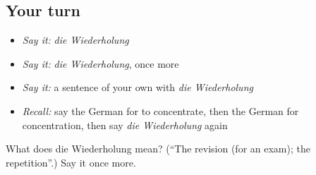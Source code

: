 \subsection*{Your turn}
\begin{itemize}
\raggedright
  \item \emph{Say it:} \emph{die Wiederholung}
  \item \emph{Say it:} \emph{die Wiederholung}, once more
  \item \emph{Say it:} a sentence of your own with \emph{die Wiederholung}
  \item \emph{Recall:} say the German for to concentrate, then the German for concentration, then say \emph{die Wiederholung} again
\end{itemize}

\begin{tcolorbox}[breakable,colback=teal!4,colframe=teal!35!black,title={Before you move on}]
What does die Wiederholung mean? (\textquotedblleft{}The revision (for an exam); the repetition\textquotedblright{}.) Say it once more.
\end{tcolorbox}
